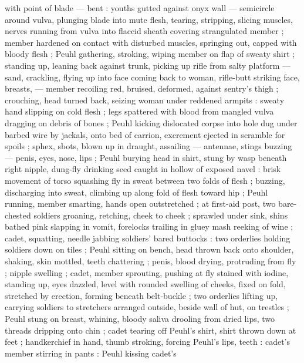 with point of blade --- bent : youths gutted against onyx wall --- semicircle around vulva, plunging
blade into mute flesh, tearing, %
stripping, slicing muscles, nerves running from vulva into flaccid sheath covering strangulated
member ; member hardened on contact with disturbed muscles, springing out, capped with bloody flesh
; Peuhl gathering, stroking, wiping member on flap of sweaty shirt ; standing up, leaning back
against trunk, picking up rifle from salty platform --- sand, crackling, flying up into face
{\dashcom} coming back to woman, rifle-butt striking face, breasts, --- member recoiling red,
bruised, deformed, against sentry's thigh ; crouching, head turned back, seizing woman under
reddened armpits : sweaty hand slipping on cold flesh ; legs spattered with blood from mangled vulva
dragging on debris of bones ; Peuhl kicking dislocated corpse into hole dug under barbed wire by
jackals, onto bed of carrion, excrement ejected in scramble for spoils ; sphex, sbots, blown up in
draught, assailing --- antennae, stings buzzing --- penis, eyes, nose, lips ; Peuhl burying head in
shirt, stung by wasp beneath right nipple, dung-fly drinking seed caught in hollow of exposed navel
: brisk movement of torso squashing fly in sweat between two folds of flesh ; buzzing, discharging
into sweat, climbing up along fold of flesh toward hip ; Peuhl running, member smarting, hands open
outstretched ; at first-aid post, two bare-chested soldiers groaning, retching, cheek to cheek ;
sprawled under sink, shins bathed pink slapping in vomit, forelocks trailing in gluey mash reeking
of wine ; cadet, squatting, needle jabbing soldiers' bared buttocks : two orderlies holding soldiers
down on tiles ; Peuhl sitting on bench, head thrown back onto shoulder, shaking, skin mottled, teeth
chattering ; penis, blood drying, protruding from fly ; nipple swelling ; cadet, member sprouting,
pushing at fly stained with iodine, standing up, eyes dazzled, level with rounded swelling of
cheeks, fixed on fold, stretched by erection, forming beneath belt-buckle ; two orderlies lifting
up, carrying soldiers to stretchers arranged outside, beside wall of hut, on trestles ; Peuhl stung
on breast, whining, bloody saliva drooling from dried lips, two threads dripping onto chin ; cadet
tearing off Peuhl's shirt, shirt thrown down at feet ; handkerchief in hand, thumb stroking, forcing
Peuhl's lips, teeth : %
cadet's member stirring in pants {\thd}  : Peuhl kissing cadet's
